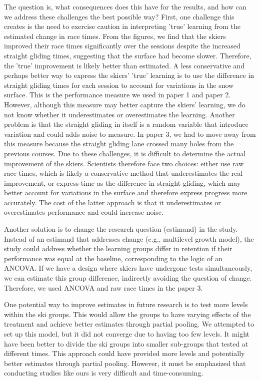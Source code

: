The question is, what consequences does this have for the results, and how can we address these challenges the best possible way? First, one challenge this creates is the need to exercise caution in interpreting 'true' learning from the estimated change in race times. From the figures, we find that the skiers improved their race times significantly over the sessions despite the increased straight gliding times, suggesting that the surface had become slower. Therefore, the 'true' improvement is likely better than estimated. A less conservative and perhaps better way to express the skiers' 'true' learning is to use the difference in straight gliding times for each session to account for variations in the snow surface. This is the performance measure we used in paper 1 and paper 2. However, although this measure may better capture the skiers' learning, we do not know whether it underestimates or overestimates the learning. Another problem is that the straight gliding in itself is a random variable that introduce variation and could adds noise to measure. In paper 3, we had to move away from this measure because the straight gliding lane crossed many holes from the previous courses. Due to these challenges, it is difficult to determine the actual improvement of the skiers. Scientists therefore face two choices: either use raw race times, which is likely a conservative method that underestimates the real improvement, or express time as the difference in straight gliding, which may better account for variations in the surface and therefore express progress more accurately. The cost of the latter approach is that it underestimates or overestimates performance and could increase noise. 

Another solution is to change the research question (estimand) in the study. Instead of an estimand that addresses change (e.g., multilevel growth model), the study could address whether the learning groups differ in retention if their performance was equal at the baseline, corresponding to the logic of an ANCOVA. If we have a design where skiers have undergone tests simultaneously, we can estimate this group difference, indirectly avoiding the question of change. Therefore, we used ANCOVA and raw race times in the paper 3. 

One potential way to improve estimates in future research is to test more levels within the ski groups. This would allow the groups to have varying effects of the treatment and achieve better estimates through partial pooling. We attempted to set up this model, but it did not converge due to having too few levels. It might have been better to divide the ski groups into smaller sub-groups that tested at different times. This approach could have provided more levels and potentially better estimates through partial pooling. However, it must be emphasized that conducting studies like ours is very difficult and time-consuming. 


